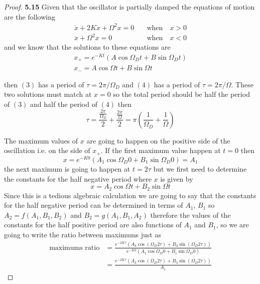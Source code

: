 \documentclass[11pt]{article}
\theoremstyle{definition}
\begin{document}
    \begin{proof}{\textbf{5.15}}
        Given that the oscillator is partially damped the equations of motion
        are the following
        \begin{align}
            \ddot{x} + 2K\dot{x} + \Omega^2x = 0 \quad&\text{when}\quad x>0\\
            \ddot{x} + \Omega^2x = 0 \quad&\text{when}\quad x<0
        \end{align}
        and we know that the solutions to these equations are
        \begin{align}
            x_{+} = e^{-Kt}(A\cos{\Omega_Dt} + B\sin{\Omega_Dt}) \\
            x_{-} = A\cos{\Omega t} + B\sin{\Omega t}
        \end{align}

        then $(3)$ has a period of $\tau = 2\pi/\Omega_D$ and $(4)$ has a
        period of $\tau = 2\pi/\Omega$. These two solutions must match at $x=0$
        so the total period should be half the period of $(3)$ and half the
        period of $(4)$ then
        $$\tau = \frac{\frac{2\pi}{\Omega_D}}{2} + \frac{\frac{2\pi}{\Omega}}{2}
            = \pi\left(\frac{1}{\Omega_D} + \frac{1}{\Omega}\right)$$

        The maximum values of $x$ are going to happen on the positive side 
        of the oscillation i.e. on the side of $x_{+}$. If the first maximum
        value happen at $t = 0$ then
        $$x = e^{-K0}(A_1\cos{\Omega_D0} + B_1\sin{\Omega_D0}) = A_1$$
        the next maximum is going to happen at $t=2\tau$ but we first need to
        determine the constants for the half negative period where $x$ is given
        by
        $$x = A_2\cos{\Omega t} + B_2\sin{\Omega t}$$
        Since this is a tedious algebraic calculation we are going to say that
        the constants for the half negative period can be determined in terms
        of $A_1$, $B_1$ so $A_2 = f(A_1, B_1, B_2)$ and $B_2 = g(A_1, B_1, A_2)$
        therefore the values of the constants for the half positive period are
        also functions of $A_1$ and $B_1$, so we are going to write the ratio
        between maximums just as
        \begin{align*}
            \text{maximums ratio} &= \frac{e^{-2K\tau}(A_3\cos(\Omega_D2\tau) + B_3\sin(\Omega_D2\tau))}{e^{-K0}(A_1\cos{\Omega_D0} + B_1\sin{\Omega_D0})} \\
                &= \frac{e^{-2K\tau}(A_3\cos(\Omega_D2\tau) + B_3\sin(\Omega_D2\tau))}{A_1}
        \end{align*}
    \end{proof}
\end{document}
